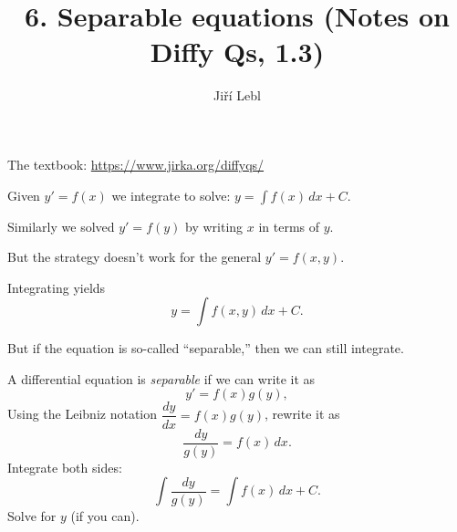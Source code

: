 \documentclass[10pt,aspectratio=169]{beamer}
\author{Ji\v{r}\'i Lebl}
\institute[OSU]{%
Oklahoma State University%
}
\title{6. Separable equations (Notes on Diffy Qs, 1.3)}
\date{}
\begin{document}
\begin{frame}
\titlepage


\begin{center}
The textbook: \url{https://www.jirka.org/diffyqs/}
\end{center}
\end{frame}

\begin{frame}
Given
$y' = f(x)$ we integrate to solve: $y = \int f(x) \,dx + C$. 

\medskip
\pause

Similarly we solved $y' = f(y)$ by writing $x$ in terms of $y$.

\medskip
\pause

But the strategy doesn't work for the general $y' = f(x,y)$.

\medskip
\pause

Integrating yields
\[
y = \int f(x,y) \,dx + C .
\]

\medskip
\pause

But if the equation is so-called ``separable,'' then we can
still integrate.

\end{frame}

\begin{frame}

A differential equation is \emph{separable} if we can write it as
\[
y' = f(x)g(y) ,
\]
\pause
Using the Leibniz notation $\dfrac{dy}{dx} = f(x)g(y)$, rewrite it as
\[
\frac{dy}{g(y)} = f(x) \,dx .
\]
\pause
Integrate both sides:
\[
\int \frac{dy}{g(y)} = \int f(x) \,dx + C .
\]
\pause
Solve for $y$ (if you can).

\end{frame}
\end{document}
